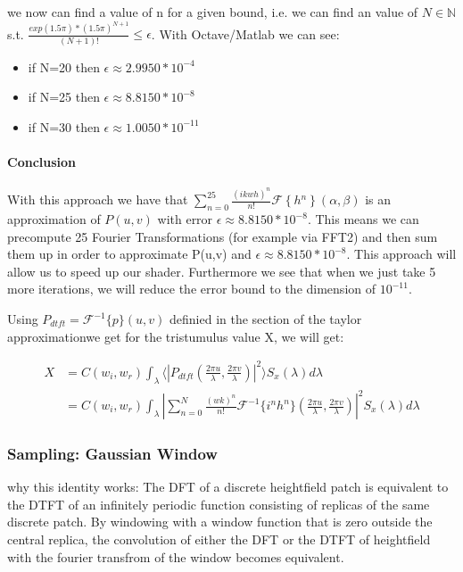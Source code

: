 we now can find a value of n for a given bound, i.e. we can find an value of $N\mathbb{\in N}$ s.t. $\frac{exp(1.5\pi)*(1.5\pi)^{N+1}}{(N+1)!}\leq\epsilon$.
With Octave/Matlab we can see: 
\begin{itemize}
\item if N=20 then $\epsilon\approx2.9950*10^{-4}$
\item if N=25 then $\epsilon\approx8.8150*10^{-8}$
\item if N=30 then $\epsilon\approx1.0050*10^{-11}$
\end{itemize}

\paragraph {Conclusion}
With this approach we have that $\sum_{n=0}^{25}\frac{(ikwh)^{n}}{n!}\mathcal{F}\left\{ h{}^{n}\right\} (\alpha,\beta)$ is
an approximation of $P(u,v)$ with error $\epsilon\approx8.8150*10^{-8}$.
This means we can precompute 25 Fourier Transformations (for example via FFT2) and then sum them up in order to approximate P(u,v) and $\epsilon\approx8.8150*10^{-8}$. This approach will allow us to speed up our shader. Furthermore we see that when we just take 5 more iterations, we will reduce the error bound to the dimension of $10^{-11}$.

Using $P_{dtft} = \mathcal{F}^{-1}\{p\}(u,v)$ definied in the section of the taylor approximationwe get for the tristumulus value X, we will get:

\begin{align*}
X 
& = C(w_i,w_r) \int_{\lambda} \langle \left|P_{dtft}(\frac{2\pi u}{\lambda}, \frac{2\pi v}{\lambda})\right|^2\rangle S_x(\lambda)d\lambda \\
& = C(w_i,w_r) \int_{\lambda} \left| \sum_{n=0}^N \frac{(wk)^n}{n!} \mathcal{F}^{-1}\{i^n h^n\}(\frac{2\pi u}{\lambda}, \frac{2\pi v}{\lambda})\right|^2 S_x(\lambda)d\lambda
\end{align*}


\subsubsection{Sampling: Gaussian Window}
why this identity works:
The DFT of a discrete heightfield patch is equivalent to the DTFT of an infinitely periodic function consisting of replicas of the same discrete patch. By windowing with a window function that is zero outside the central replica, the convolution of either the DFT or the DTFT of heightfield with the fourier transfrom of the window becomes equivalent.


